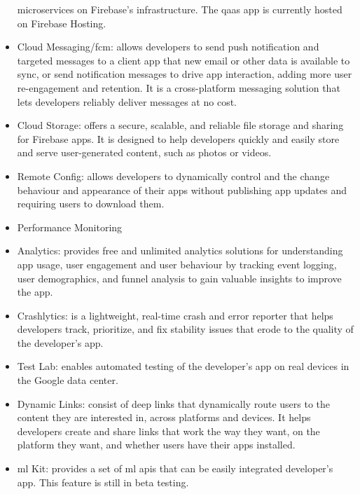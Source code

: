 \begin{multicols}{2}
\begin{itemize}
                  microservices on Firebase's infrastructure. The \acrshort{qaas} app is currently hosted on Firebase
                  Hosting.
            \item Cloud Messaging/\acrshort{fcm}: allows developers to send push notification and targeted messages to a
                  client app that new email or other data is available to sync, or send notification messages to drive app
                  interaction, adding more user re-engagement and retention. It is a cross-platform messaging solution that lets
                  developers reliably deliver messages at no cost.
            \item Cloud Storage: offers a secure, scalable, and reliable file storage and sharing for Firebase apps.
                  It is designed to help developers quickly and easily store and serve user-generated content, such as
                  photos or videos.
            \item Remote Config: allows developers to dynamically control and the change behaviour and appearance of their apps
                  without publishing app updates and requiring users to download them.
            \item Performance Monitoring
            \item Analytics: provides free and unlimited analytics solutions for understanding app usage, user engagement and
                  user behaviour by tracking event logging, user demographics, and funnel analysis to gain valuable insights to
                  improve the app.
            \item Crashlytics: is a lightweight, real-time crash and error reporter that helps developers track, prioritize,
                  and fix stability issues that erode to the quality of the developer's app.
            \item Test Lab: enables automated testing of the developer's app on real devices in the Google data center.
            \item Dynamic Links: consist of deep links that dynamically route users to the content they are interested in,
                  across platforms and devices. It helps developers create and share links that work the way they want, on the
                  platform they want, and whether users have their apps installed.
            \item \acrshort{ml} Kit: provides a set of \acrshort{ml} \acrshort{api}s that can be easily integrated developer's app.
                  This feature is still in beta testing.
      \end{itemize}


\end{multicols}

